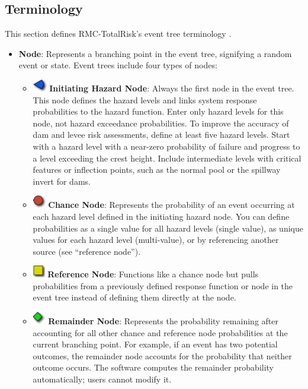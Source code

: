 \documentclass[
]{book}
\begin{document}
\hypertarget{terminology}{%
\subsection{Terminology}\label{terminology}}

This section defines RMC-TotalRisk's event tree terminology \citep{cite-TechRef}.

\begin{itemize}
\item
  \textbf{Node}: Represents a branching point in the event tree, signifying a random event or state. Event trees include four types of nodes:

  \begin{itemize}
  \item
    \includegraphics{images/hazardnode.png} \textbf{Initiating Hazard Node}: Always the first node in the event tree. This node defines the hazard levels and links system response probabilities to the hazard function. Enter only hazard levels for this node, not hazard exceedance probabilities. To improve the accuracy of dam and levee risk assessments, define at least five hazard levels. Start with a hazard level with a near-zero probability of failure and progress to a level exceeding the crest height. Include intermediate levels with critical features or inflection points, such as the normal pool or the spillway invert for dams.
  \item
    \includegraphics{images/chancenode.png} \textbf{Chance Node}: Represents the probability of an event occurring at each hazard level defined in the initiating hazard node. You can define probabilities as a single value for all hazard levels (single value), as unique values for each hazard level (multi-value), or by referencing another source (see ``reference node'').
  \item
    \includegraphics{images/referencenode.png} \textbf{Reference Node}: Functions like a chance node but pulls probabilities from a previously defined response function or node in the event tree instead of defining them directly at the node.
  \item
    \includegraphics{images/remaindernode.png} \textbf{Remainder Node}: Represents the probability remaining after accounting for all other chance and reference node probabilities at the current branching point. For example, if an event has two potential outcomes, the remainder node accounts for the probability that neither outcome occurs. The software computes the remainder probability automatically; users cannot modify it.

\end{itemize}
\end{itemize}
\end{document}

